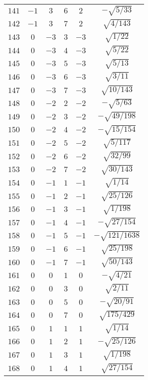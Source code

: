 \begin{table}
\begin{center}
\begin{tabular}{|c|c|c|c|c|c|}
$141$ & $-1$ & $3$ & $6$ & $2$ & $-\sqrt{5/33}$ \\ 
$142$ & $-1$ & $3$ & $7$ & $2$ & $\sqrt{4/143}$ \\ 
$143$ & $0$ & $-3$ & $3$ & $-3$ & $\sqrt{1/22}$ \\ 
$144$ & $0$ & $-3$ & $4$ & $-3$ & $\sqrt{5/22}$ \\ 
$145$ & $0$ & $-3$ & $5$ & $-3$ & $\sqrt{5/13}$ \\ 
$146$ & $0$ & $-3$ & $6$ & $-3$ & $\sqrt{3/11}$ \\ 
$147$ & $0$ & $-3$ & $7$ & $-3$ & $\sqrt{10/143}$ \\ 
$148$ & $0$ & $-2$ & $2$ & $-2$ & $-\sqrt{5/63}$ \\ 
$149$ & $0$ & $-2$ & $3$ & $-2$ & $-\sqrt{49/198}$ \\ 
$150$ & $0$ & $-2$ & $4$ & $-2$ & $-\sqrt{15/154}$ \\ 
$151$ & $0$ & $-2$ & $5$ & $-2$ & $\sqrt{5/117}$ \\ 
$152$ & $0$ & $-2$ & $6$ & $-2$ & $\sqrt{32/99}$ \\ 
$153$ & $0$ & $-2$ & $7$ & $-2$ & $\sqrt{30/143}$ \\ 
$154$ & $0$ & $-1$ & $1$ & $-1$ & $\sqrt{1/14}$ \\ 
$155$ & $0$ & $-1$ & $2$ & $-1$ & $\sqrt{25/126}$ \\ 
$156$ & $0$ & $-1$ & $3$ & $-1$ & $\sqrt{1/198}$ \\ 
$157$ & $0$ & $-1$ & $4$ & $-1$ & $-\sqrt{27/154}$ \\ 
$158$ & $0$ & $-1$ & $5$ & $-1$ & $-\sqrt{121/1638}$ \\ 
$159$ & $0$ & $-1$ & $6$ & $-1$ & $\sqrt{25/198}$ \\ 
$160$ & $0$ & $-1$ & $7$ & $-1$ & $\sqrt{50/143}$ \\ 
$161$ & $0$ & $0$ & $1$ & $0$ & $-\sqrt{4/21}$ \\ 
$162$ & $0$ & $0$ & $3$ & $0$ & $\sqrt{2/11}$ \\ 
$163$ & $0$ & $0$ & $5$ & $0$ & $-\sqrt{20/91}$ \\ 
$164$ & $0$ & $0$ & $7$ & $0$ & $\sqrt{175/429}$ \\ 
$165$ & $0$ & $1$ & $1$ & $1$ & $\sqrt{1/14}$ \\ 
$166$ & $0$ & $1$ & $2$ & $1$ & $-\sqrt{25/126}$ \\ 
$167$ & $0$ & $1$ & $3$ & $1$ & $\sqrt{1/198}$ \\ 
$168$ & $0$ & $1$ & $4$ & $1$ & $\sqrt{27/154}$ \\ 

\end{tabular}
\end{center}
\end{table}
